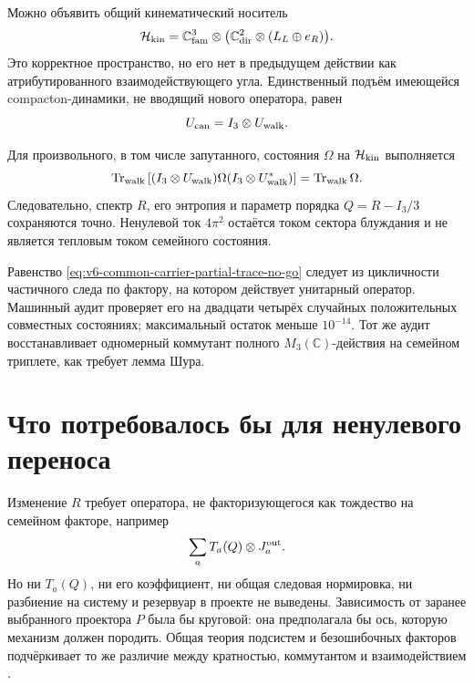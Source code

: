 Можно объявить общий кинематический носитель
\begin{equation}
 \mathcal H_{\rm kin}
 =\mathbb C^3_{\rm fam}\otimes
  \bigl(\mathbb C^2_{\rm dir}\otimes(L_L\oplus e_R)\bigr).
 \label{eq:v6-common-carrier-kinematic-product}
\end{equation}
Это корректное пространство, но его нет в предыдущем действии как
атрибутированного взаимодействующего угла. Единственный подъём имеющейся
compacton-динамики, не вводящий нового оператора, равен
\begin{equation}
 U_{\rm can}=I_3\otimes U_{\rm walk}.
\end{equation}

\begin{theorem}
Для произвольного, в том числе запутанного, состояния $\Omega$ на
$\mathcal H_{\rm kin}$ выполняется
\begin{equation}
 \operatorname{Tr}_{\rm walk}
 \left[(I_3\otimes U_{\rm walk})\Omega
 (I_3\otimes U_{\rm walk}^{*})\right]
 =\operatorname{Tr}_{\rm walk}\Omega.
 \label{eq:v6-common-carrier-partial-trace-no-go}
\end{equation}
Следовательно, спектр $R$, его энтропия и параметр порядка $Q=R-I_3/3$
сохраняются точно. Ненулевой ток $4\pi^2$ остаётся током сектора
блуждания и
не является тепловым током семейного состояния.
\end{theorem}

Равенство \eqref{eq:v6-common-carrier-partial-trace-no-go} следует из
цикличности частичного следа по фактору, на котором действует унитарный
оператор. Машинный аудит проверяет его на двадцати четырёх случайных
положительных совместных состояниях; максимальный остаток меньше
$10^{-14}$. Тот же аудит восстанавливает одномерный коммутант полного
$M_3(\mathbb C)$-действия на семейном триплете, как требует лемма Шура.

\section{Что потребовалось бы для ненулевого переноса}

Изменение $R$ требует оператора, не факторизующегося как тождество на
семейном факторе, например
\begin{equation}
 \sum_a T_a(Q)\otimes J_a^{\rm out}.
 \label{eq:v6-common-carrier-missing-interaction}
\end{equation}
Но ни $T_a(Q)$, ни его коэффициент, ни общая следовая нормировка, ни
разбиение на систему и резервуар в проекте не выведены. Зависимость от
заранее выбранного проектора $P$ была бы круговой: она предполагала бы
ось, которую механизм должен породить. Общая теория подсистем и
безошибочных факторов подчёркивает то же различие между кратностью,
коммутантом и взаимодействием
\cite{common-carrier-zanardi1997,common-carrier-knill2000}.

